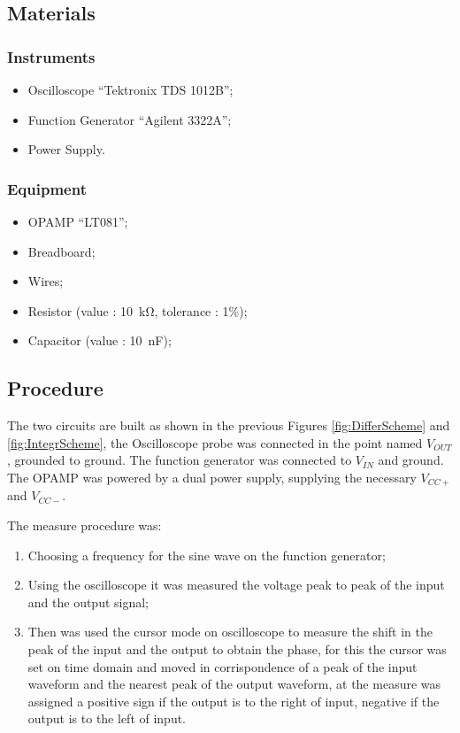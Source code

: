 \documentclass[a4paper, twocolumn]{article}
\begin{document}
\subsection{Materials}
\subsubsection{Instruments}
\begin{itemize}
    \item Oscilloscope ``Tektronix TDS 1012B'';
    \item Function Generator ``Agilent 3322A'';
    \item Power Supply.
\end{itemize}
\subsubsection{Equipment}
\begin{itemize}
    \item OPAMP ``LT081'';
    \item Breadboard;
    \item Wires;
    \item Resistor (value : \SI{10}{\kilo\ohm}, tolerance : 1\%);
    \item Capacitor (value : \SI{10}{\nano\farad});
\end{itemize}

\subsection{Procedure}

The two circuits are built as shown in the previous Figures \ref{fig:DifferScheme} and \ref{fig:IntegrScheme}, the Oscilloscope probe was connected in the point named \(V_{OUT}\), grounded to ground. The function generator was connected to \(V_{IN}\) and ground.   The OPAMP was powered by a dual power supply, supplying the necessary \(V_{CC+}\) and \(V_{CC-}\).

The measure procedure was:
\begin{enumerate}
    \item Choosing a frequency for the sine wave on the function generator;
    \item Using the oscilloscope it was measured the voltage peak to peak of the input and the output signal;
    \item Then was used the cursor mode on oscilloscope to measure the shift in the peak of the input and the output to obtain the phase, for this the cursor was set on time domain and moved in corrispondence of a peak of the input waveform and the nearest peak of the output waveform, at the measure was assigned a positive sign if the output is to the right of input, negative if the output is to the left of input. 
\end{enumerate}
\end{document}
